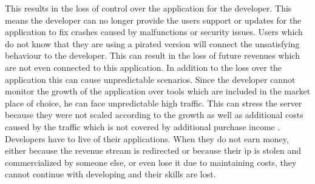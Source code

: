 This results in the loss of control over the application for the developer.
This means the developer can no longer provide the users support or updates for the application to fix crashes caused by malfunctions or security issues.
Users which do not know that they are using a pirated version will connect the unsatisfying behaviour to the developer.
This can result in the loss of future revenues which are not even connected to this application.
In addition to the loss over the application this can cause unpredictable scenarios.
Since the developer cannot monitor the growth of the application over tools which are included in the market place of choice, he can face unpredictable high traffic.
This can stress the server because they were not scaled according to the growth as well as additional costs caused by the traffic which is not covered by additional purchase income \cite{lierschDeveloperThreats}.
\newline
\newline
Developers have to live of their applications.
When they do not earn money, either because the revenue stream is redirected or because their \gls{ip} is stolen and commercialized by someone else, or even lose it due to maintaining costs, they cannot continue with developing and their skills are lost.






